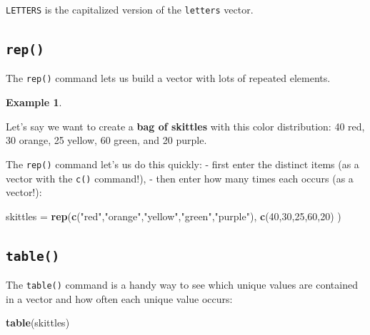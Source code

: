 \documentclass[
]{book}
\newenvironment{Shaded}{\begin{snugshade}}{\end{snugshade}}
\newcommand{\DecValTok}[1]{\textcolor[rgb]{0.00,0.00,0.81}{#1}}
\newcommand{\FunctionTok}[1]{\textcolor[rgb]{0.13,0.29,0.53}{\textbf{#1}}}
\newcommand{\NormalTok}[1]{#1}
\newcommand{\OtherTok}[1]{\textcolor[rgb]{0.56,0.35,0.01}{#1}}
\newcommand{\StringTok}[1]{\textcolor[rgb]{0.31,0.60,0.02}{#1}}
\theoremstyle{definition}
\theoremstyle{definition}
\newtheorem{example}{Example}[chapter]
\theoremstyle{definition}
\theoremstyle{definition}
\theoremstyle{remark}
\begin{document}
\texttt{LETTERS} is the capitalized version of the \texttt{letters} vector.

\subsection*{\texorpdfstring{\texttt{rep()}}{rep()}}\label{rep}

The \texttt{rep()} command lets us build a vector with lots of repeated elements.

\begin{example}
\protect\hypertarget{exm:skittles}{}\label{exm:skittles}

Let's say we want to create a \textbf{bag of skittles} with this color distribution: 40 red, 30 orange, 25 yellow, 60 green, and 20 purple.

The \texttt{rep()} command let's us do this quickly:
- first enter the distinct items (as a vector with the \texttt{c()} command!),
- then enter how many times each occurs (as a vector!):

\begin{Shaded}
\begin{Highlighting}[]
\NormalTok{skittles }\OtherTok{=} \FunctionTok{rep}\NormalTok{(}\FunctionTok{c}\NormalTok{(}\StringTok{"red"}\NormalTok{,}\StringTok{"orange"}\NormalTok{,}\StringTok{"yellow"}\NormalTok{,}\StringTok{"green"}\NormalTok{,}\StringTok{"purple"}\NormalTok{),}
               \FunctionTok{c}\NormalTok{(}\DecValTok{40}\NormalTok{,}\DecValTok{30}\NormalTok{,}\DecValTok{25}\NormalTok{,}\DecValTok{60}\NormalTok{,}\DecValTok{20}\NormalTok{)}
\NormalTok{               )}
\end{Highlighting}
\end{Shaded}

\end{example}

\subsection*{\texorpdfstring{\texttt{table()}}{table()}}\label{table}

The \texttt{table()} command is a handy way to see which unique values are contained in a vector and how often each unique value occurs:

\begin{Shaded}
\begin{Highlighting}[]
\FunctionTok{table}\NormalTok{(skittles)}
\end{Highlighting}
\end{Shaded}
\end{document}
